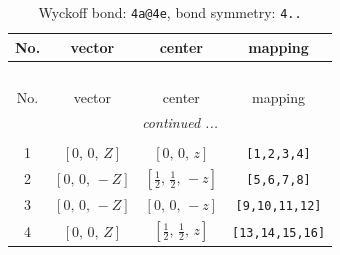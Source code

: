 \documentclass[fleqn,8pt]{jsarticle}
\begin{document}
\begin{longtable}{cccc}
\caption{Wyckoff bond: {\tt 4a@4e}, bond symmetry: {\tt 4..}}
 \\
 \hline \hline
No. & vector & center & mapping \\ \hline \endfirsthead

\multicolumn{3}{l}{\tablename\ \thetable{}} \\
 \hline \hline
No. & vector & center & mapping \\ \hline \endhead

 \hline \hline
\multicolumn{3}{r}{\footnotesize\it continued ...} \\ \endfoot

 \hline \hline
\multicolumn{3}{r}{} \\ \endlastfoot

1 & $\left[ 0,\, 0,\, Z \right]$ & $\left[ 0,\, 0,\, z \right]$ & {\tt [1,2,3,4]} \\ \hline
2 & $\left[ 0,\, 0,\, - Z \right]$ & $\left[ \frac{1}{2},\, \frac{1}{2},\, - z \right]$ & {\tt [5,6,7,8]} \\ \hline
3 & $\left[ 0,\, 0,\, - Z \right]$ & $\left[ 0,\, 0,\, - z \right]$ & {\tt [9,10,11,12]} \\ \hline
4 & $\left[ 0,\, 0,\, Z \right]$ & $\left[ \frac{1}{2},\, \frac{1}{2},\, z \right]$ & {\tt [13,14,15,16]} \\
\end{longtable}
\renewcommand{\arraystretch}{1.2}
\end{document}
